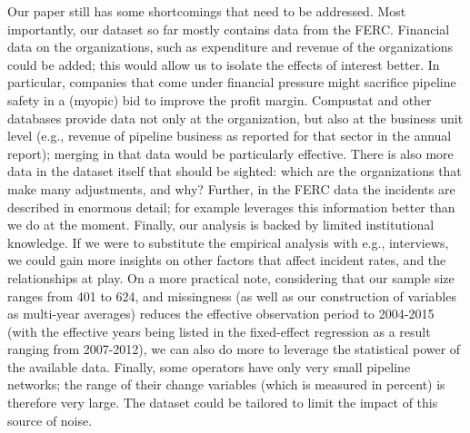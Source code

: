 Our paper still has some shortcomings that need to be addressed. Most importantly, our dataset so far mostly contains data from the FERC. Financial data on the organizations, such as expenditure and revenue of the organizations could be added; this would allow us to isolate the effects of interest better. In particular, companies that come under financial pressure might sacrifice pipeline safety in a (myopic) bid to improve the profit margin. Compustat and other databases provide data not only at the organization, but also at the business unit level (e.g., revenue of pipeline business as reported for that sector in the annual report); merging in that data would be particularly effective. There is also more data in the dataset itself that should be sighted: which are the organizations that make many adjustments, and why? Further, in the FERC data the incidents are described in enormous detail; \citet{Park2019} for example leverages this information better than we do at the moment. Finally, our analysis is backed by limited institutional knowledge. If we were to substitute the empirical analysis with e.g., interviews, we could gain more insights on other factors that affect incident rates, and the relationships at play. On a more practical note, considering that our sample size ranges from 401 to 624, and missingness (as well as our construction of variables as multi-year averages) reduces the effective observation period to 2004-2015 (with the effective years being listed in the fixed-effect regression as a result ranging from 2007-2012), we can also do more to leverage the statistical power of the available data. Finally, some operators have only very small pipeline networks; the range of their change variables (which is measured in percent) is therefore very large. The dataset could be tailored to limit the impact of this source of noise.